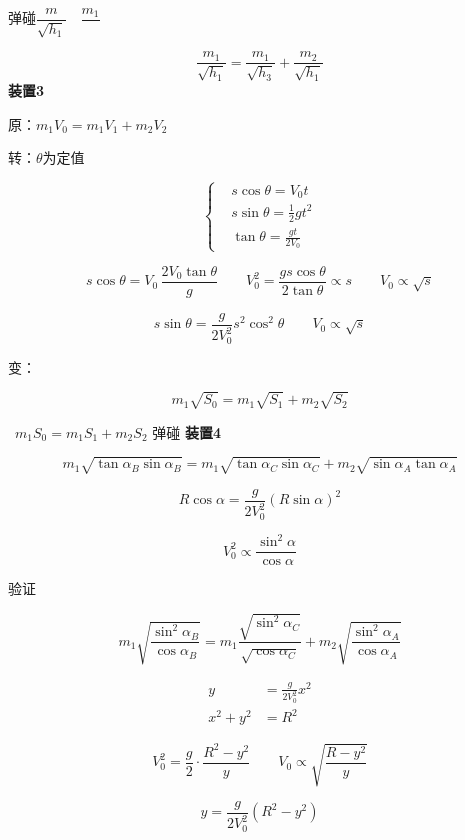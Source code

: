 弹碰\quad $\dfrac{m}{\sqrt{h_1}}$\ \unclear{=}\ $\dfrac{m_1}{\ \ }$ %

\[\frac{m_1}{\sqrt{h_1}}=\frac{m_1}{\sqrt{h_3}}+\frac{m_2}{\sqrt{h_1}}\] %
\textbf{装置3}


原：$m_1V_0=m_1V_1+m_2V_2$

转：$\theta$为定值

\[
\left\{
\begin{aligned}
& s\cos\theta=V_0t\\
& \boxed{s\sin\theta=\tfrac{1}{2}gt^2}\\
& \tan\theta=\frac{gt}{2V_0}
\end{aligned}
\right.
\] %

\[
s\cos\theta=V_0\,\frac{2V_0\tan\theta}{g}\qquad V_0^2=\frac{gs\cos\theta}{2\tan\theta}\propto s\qquad V_0\propto\sqrt{s}
\]

\[
s\sin\theta=\frac{g}{2V_0^2}s^2\cos^2\theta\qquad V_0\propto\sqrt{s}
\]

变：
\begin{keybox}
\[m_1\sqrt{S_0}=m_1\sqrt{S_1}+m_2\sqrt{S_2}\]
\end{keybox}

\ $m_1S_0=m_1S_1+m_2S_2$ 弹碰 %
\textbf{装置4}


\[
m_1\sqrt{\tan\alpha_B\sin\alpha_B}=m_1\sqrt{\tan\alpha_C\sin\alpha_C}+m_2\sqrt{\sin\alpha_A\tan\alpha_A}
\] %

\[R\cos\alpha=\frac{g}{2V_0^2}(R\sin\alpha)^2\]

\[V_0^2\propto\frac{\sin^2\alpha}{\cos\alpha}\]

验证
\begin{keybox}
\[
m_1\sqrt{\frac{\sin^2\alpha_B}{\cos\alpha_B}}=m_1\frac{\sqrt{\sin^2\alpha_C}}{\sqrt{\cos\alpha_C}}+m_2\sqrt{\frac{\sin^2\alpha_A}{\cos\alpha_A}}
\] %
\end{keybox}

\begin{align*}
y&=\frac{g}{2V_0^2}x^2\\
x^2+y^2&=R^2
\end{align*}


\[V_0^2=\frac{g}{2}\cdot\frac{R^2-y^2}{y}\qquad V_0\propto\sqrt{\frac{R-y^2}{y}}\] %

\[y=\frac{g}{2V_0^2}(R^2-y^2)\]
